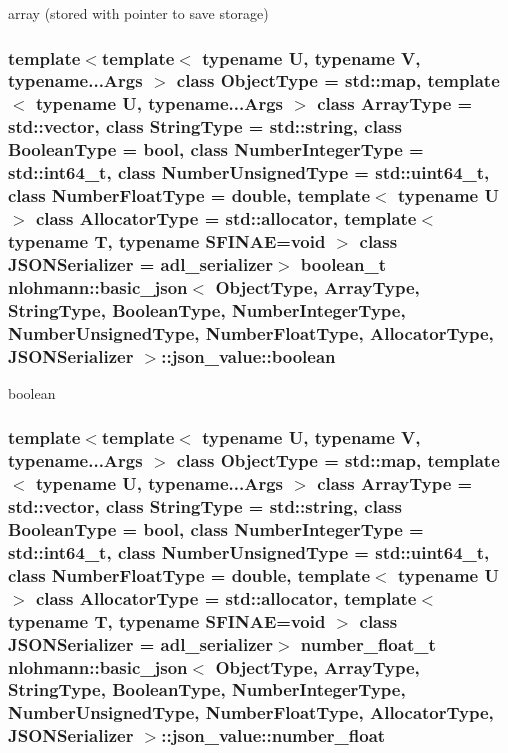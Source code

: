 array (stored with pointer to save storage) 

\subsubsection[{\texorpdfstring{boolean}{boolean}}]{\setlength{\rightskip}{0pt plus 5cm}template$<$template$<$ typename U, typename V, typename...\+Args $>$ class Object\+Type = std\+::map, template$<$ typename U, typename...\+Args $>$ class Array\+Type = std\+::vector, class String\+Type  = std\+::string, class Boolean\+Type  = bool, class Number\+Integer\+Type  = std\+::int64\+\_\+t, class Number\+Unsigned\+Type  = std\+::uint64\+\_\+t, class Number\+Float\+Type  = double, template$<$ typename U $>$ class Allocator\+Type = std\+::allocator, template$<$ typename T, typename S\+F\+I\+N\+A\+E=void $>$ class J\+S\+O\+N\+Serializer = adl\+\_\+serializer$>$ {\bf boolean\+\_\+t} {\bf nlohmann\+::basic\+\_\+json}$<$ Object\+Type, Array\+Type, String\+Type, Boolean\+Type, Number\+Integer\+Type, Number\+Unsigned\+Type, Number\+Float\+Type, Allocator\+Type, J\+S\+O\+N\+Serializer $>$\+::json\+\_\+value\+::boolean}\hypertarget{unionnlohmann_1_1basic__json_1_1json__value_afd0f8ec00c40301efffd01a276959371}{}\label{unionnlohmann_1_1basic__json_1_1json__value_afd0f8ec00c40301efffd01a276959371}


boolean 

\subsubsection[{\texorpdfstring{number\+\_\+float}{number_float}}]{\setlength{\rightskip}{0pt plus 5cm}template$<$template$<$ typename U, typename V, typename...\+Args $>$ class Object\+Type = std\+::map, template$<$ typename U, typename...\+Args $>$ class Array\+Type = std\+::vector, class String\+Type  = std\+::string, class Boolean\+Type  = bool, class Number\+Integer\+Type  = std\+::int64\+\_\+t, class Number\+Unsigned\+Type  = std\+::uint64\+\_\+t, class Number\+Float\+Type  = double, template$<$ typename U $>$ class Allocator\+Type = std\+::allocator, template$<$ typename T, typename S\+F\+I\+N\+A\+E=void $>$ class J\+S\+O\+N\+Serializer = adl\+\_\+serializer$>$ {\bf number\+\_\+float\+\_\+t} {\bf nlohmann\+::basic\+\_\+json}$<$ Object\+Type, Array\+Type, String\+Type, Boolean\+Type, Number\+Integer\+Type, Number\+Unsigned\+Type, Number\+Float\+Type, Allocator\+Type, J\+S\+O\+N\+Serializer $>$\+::json\+\_\+value\+::number\+\_\+float}\hypertarget{unionnlohmann_1_1basic__json_1_1json__value_ad003495e39e78b8096e0b6fc690d146f}{}\label{unionnlohmann_1_1basic__json_1_1json__value_ad003495e39e78b8096e0b6fc690d146f}


